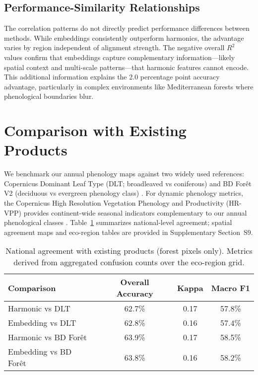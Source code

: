 \documentclass[utf8]{FrontiersinHarvard}
\begin{document}
\subsection{Performance-Similarity Relationships}

The correlation patterns do not directly predict performance differences between methods. While embeddings consistently outperform harmonics, the advantage varies by region independent of alignment strength. The negative overall $R^2$ values confirm that embeddings capture complementary information—likely spatial context and multi-scale patterns—that harmonic features cannot encode. This additional information explains the 2.0 percentage point accuracy advantage, particularly in complex environments like Mediterranean forests where phenological boundaries blur.

\section{Comparison with Existing Products}

We benchmark our annual phenology maps against two widely used references: Copernicus Dominant Leaf Type (DLT; broadleaved vs coniferous) \citep{EU2024a} and BD Forêt V2 (deciduous vs evergreen phenology class) \citep{IGN2024}. For dynamic phenology metrics, the Copernicus High Resolution Vegetation Phenology and Productivity (HR-VPP) provides continent-wide seasonal indicators complementary to our annual phenological classes \citep{EU2024b}. Table~\ref{tab:product_comparison_national} summarizes national-level agreement; spatial agreement maps and eco-region tables are provided in Supplementary Section~S9.

\begin{table}[H]
    \centering
    \caption{National agreement with existing products (forest pixels only). Metrics derived from aggregated confusion counts over the eco-region grid.}
    \begin{tabular}{lccc}
        \hline
        \textbf{Comparison} & \textbf{Overall Accuracy} & \textbf{Kappa} & \textbf{Macro F1} \\
        \hline
        Harmonic vs DLT & 62.7\% & 0.17 & 57.8\% \\
        Embedding vs DLT & 62.8\% & 0.16 & 57.4\% \\
        Harmonic vs BD Forêt & 63.9\% & 0.17 & 58.5\% \\
        Embedding vs BD Forêt & 63.8\% & 0.16 & 58.2\% \\
        \hline
    \end{tabular}
    \label{tab:product_comparison_national}
\end{table}
\end{document}
